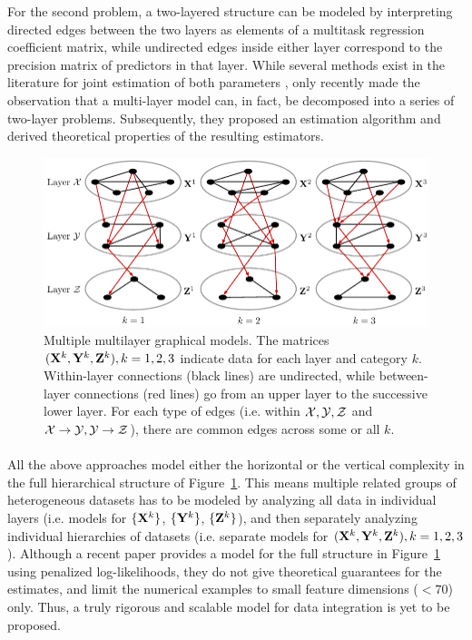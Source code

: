 For the second problem, a two-layered structure can be modeled by interpreting directed edges between the two layers as elements of a multitask regression coefficient matrix, while undirected edges inside either layer correspond to the precision matrix of predictors in that layer. While several methods exist in the literature for joint estimation of both parameters \citep{RothmanEtal10, LeeLiu12, CaiEtal12}, only recently \cite{LinEtal16} made the observation that a multi-layer model can, in fact, be decomposed into a series of two-layer problems. Subsequently, they proposed an estimation algorithm and derived theoretical properties of the resulting estimators.

\begin{figure}
\centering
\includegraphics[]{multi2layer}
\caption{Multiple multilayer graphical models. The matrices $({\mathbf{X}}^k, {\mathbf{Y}}^k, {\mathbf{Z}}^k), k = 1,2,3$ indicate data for each layer and category $k$. Within-layer connections (black lines) are undirected, while between-layer connections (red lines) go from an upper layer to the successive lower layer. For each type of edges (i.e. within ${\cal{X}}, {\cal{Y}}, {\cal{Z}}$ and ${\cal{X}} \rightarrow {\cal{Y}}, {\cal{Y}} \rightarrow {\cal{Z}}$), there are common edges across some or all $k$. }
\label{fig:multi2layer}
\end{figure}

\paragraph{}
All the above approaches model either the horizontal or the vertical complexity in the full hierarchical structure of Figure~\ref{fig:multi2layer}. This means multiple related groups of heterogeneous datasets has to be modeled by analyzing all data in individual layers (i.e. models for $\{ {\mathbf{X}}^k \}$, $\{ {\mathbf{Y}}^k \}$, $\{ {\mathbf{Z}}^k \}$), and then separately analyzing individual hierarchies of datasets (i.e. separate models for $({\mathbf{X}}^k, {\mathbf{Y}}^k, {\mathbf{Z}}^k), k = 1,2,3$). Although a recent paper \citep{ZhangOuyangZhao17} provides a model for the full structure in Figure~\ref{fig:multi2layer} using penalized log-likelihoods, they do not give theoretical guarantees for the estimates, and limit the numerical examples to small feature dimensions ($<70$) only. Thus, a truly rigorous and scalable model for data integration is yet to be proposed.

